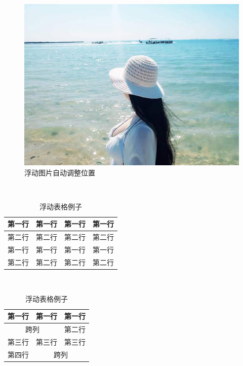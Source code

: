 \documentclass[UTF8,a5paper,12pt,portrait,openary,final]{ctexbook}
\begin{document}
\linespread{1}\selectfont

\begin{figure}[htbp!]
\centering
\includegraphics[scale=0.3]{picture/sea.jpg}
\caption{浮动图片自动调整位置}
\label{fig:float}
\end{figure}


\\


\renewcommand\arraystretch{1.5}     %
\begin{table}[htbp!]
\centering
\begin{tabular}{|l|c|r|l|}
\hline
第一行&第一行&第一行&第一行\\
\hline
第二行&第二行&第二行&第二行\\
\hline
第一行&第一行&第一行&第一行\\
\hline
第二行&第二行&第二行&第二行\\
\hline
\end{tabular}
\caption{浮动表格例子}
\label{tab:float}
\end{table}

\\ 
\begin{table}[htbp!]
\centering
\begin{tabular}{|c|c|c|}
\hline
第一行&第一行&第一行\\
\hline
\multicolumn{2}{|c|}{跨列} &第二行\\
\hline
第三行&第三行&第三行\\
\hline
第四行 & \multicolumn{2}{|c|}{跨列}\\
\hline
\end{tabular}
\caption{浮动表格例子}
\label{tab:float}
\end{table}
\end{document}
